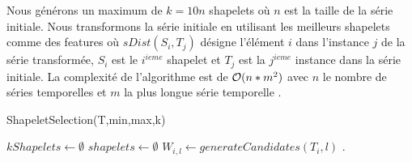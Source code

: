 Nous g\'en\'erons un maximum de $k=10n$ shapelets o\`u $n$ est la taille de la s\'erie initiale.
\newline
Nous transformons la s\'erie initiale  en utilisant les meilleurs shapelets comme des features o\`u 
$sDist(S_i, T_j)$ d\'esigne l'\'el\'ement $i$ dans l'instance $j$ de la s\'erie transform\'ee, 
$S_i$ est le $i^{ieme}$ shapelet et $T_j$ est la $j^{ieme}$ instance dans la s\'erie initiale.
La complexit\'e de l'algorithme  est de ${\cal O}(n*m^2)$ avec 
$n$ le nombre de s\'eries temporelles et
$m$ la plus longue s\'erie temporelle \cite{rakthanmanon2013fast}.
\begin{algorithm}
\caption{ShapeletSelection(T,min,max,k)}
\label{algoTransformShapelets}
\begin{algorithmic}[1]
\STATE $kShapelets \leftarrow \emptyset$
	\STATE $shapelets \leftarrow \emptyset$
		\STATE $W_{i,l} \leftarrow generateCandidates(T_i,l)$
		\ENDFOR
	\ENDFOR
\ENDFOR
{}.
\end{algorithmic}
\end{algorithm}
\newline 

